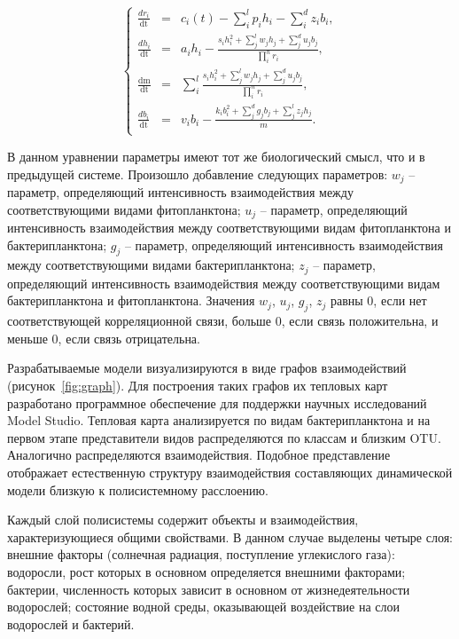 \documentclass[a4paper,12pt,openany,final]{extreport}
\begin{document}
\begin{equation}
 \left\{ \begin{array}{lcl}
\frac{dr_{i}}{\text{dt}} &=& c_{i}\left( t \right) - \sum_{i}^{l}{p_{i}h_{i}} - \sum_{i}^{d}{z_{i}b_{i}},\\
\frac{dh_{i}}{\text{dt}} &=& a_{i}h_{i} - \frac{s_{i}h_{i}^{2} + \sum_{j}^{l}{w_{j}h_{j} + \sum_{j}^{d}{u_{j}b_{j}}}}{\prod_{i}^{n}r_{i}},\\
\frac{\text{dm}}{\text{dt}} &=& \sum_{i}^{l}\frac{s_{i}h_{i}^{2} + \sum_{j}^{l}{w_{j}h_{j} + \sum_{j}^{d}{u_{j}b_{j}}}}{\prod_{i}^{n}r_{i}},\\
\frac{db_{i}}{\text{dt}} &=& v_{i}b_{i} - \frac{k_{i}b_{i}^{2} + \sum_{j}^{d}{g_{j}b_{j} + \sum_{j}^{l}{z_{j}h_{j}}}}{m}.\\
\end{array} \right.
  \label{eq:four-comp-sys-spec}
\end{equation}

В данном уравнении параметры имеют тот же биологический смысл, что и в
предыдущей системе. Произошло добавление следующих параметров: \(w_{j}\)
-- параметр, определяющий интенсивность взаимодействия между
соответствующими видами фитопланктона; \(u_{j}\) -- параметр,
определяющий интенсивность взаимодействия между соответствующими видам
фитопланктона и бактерипланктона; \(g_{j}\) -- параметр, определяющий
интенсивность взаимодействия между соответствующими видами
бактерипланктона; \(z_{j}\) -- параметр, определяющий интенсивность
взаимодействия между соответствующими видам бактерипланктона и
фитопланктона. Значения \(w_{j}\), \(u_{j}\), \(g_{j}\), \(z_{j}\) равны 0, если
нет соответствующей корреляционной связи, больше 0, если связь
положительна, и меньше 0, если связь отрицательна.

Разрабатываемые модели визуализируются в виде графов взаимодействий
(рисунок~\ref{fig:graph}). Для построения таких графов их тепловых карт разработано
программное обеспечение для поддержки научных исследований Model Studio.
Тепловая карта анализируется по видам бактерипланктона и на первом этапе
представители видов распределяются по классам и близким OTU. Аналогично
распределяются взаимодействия. Подобное представление отображает
естественную структуру взаимодействия составляющих динамической модели
близкую к полисистемному расслоению.

Каждый слой полисистемы содержит объекты и взаимодействия,
характеризующиеся общими свойствами. В данном случае выделены четыре
слоя: внешние факторы (солнечная радиация, поступление углекислого
газа): водоросли, рост которых в основном определяется внешними
факторами; бактерии, численность которых зависит в основном от
жизнедеятельности водорослей; состояние водной среды, оказывающей
воздействие на слои водорослей и бактерий.
\end{document}
